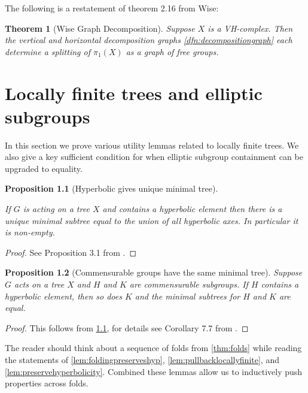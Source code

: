\documentclass[12pt,parskip=full]{report}
\theoremstyle{plain}
\newtheorem{thm}{Theorem}[section]
\newtheorem{prop}[thm]{Proposition}
\theoremstyle{definition}
\begin{document}
The following is a restatement of theorem 2.16 \cite{wisethesis} from Wise:
\begin{thm}[Wise Graph Decomposition]
\label{thm:wisegraph}
Suppose \(X\) is a VH-complex. Then the vertical and horizontal decomposition graphs \ref{dfn:decompositiongraph} each determine a splitting of \(\pi_1(X)\) as a graph of free groups. 
\end{thm}

\chapter{Locally finite trees and elliptic subgroups}

In this section we prove various utility lemmas related to locally finite trees. We also give a key sufficient condition for when elliptic subgroup containment can be upgraded to equality.

\begin{prop}
    [Hyperbolic gives unique minimal tree]
    \label{pro:uniquemintree}
    
    If $G$ is acting on a tree $X$ and contains a hyperbolic element then there is a unique minimal subtree equal to the union of all hyperbolic axes. In particular it is non-empty.
\end{prop}
\begin{proof}
See Proposition 3.1 from \cite{hymanbass}.
\end{proof}
\begin{prop}
    [Commensurable groups have the same minimal tree]
    \label{pro:commintree}
    Suppose $G$ acts on a tree $X$ and $H$ and $K$ are commensurable subgroups. If $H$ contains a hyperbolic element, then so does $K$ and the minimal subtrees for $H$ and $K$ are equal.
\end{prop}
\begin{proof}
    This follows from \ref{pro:uniquemintree}, for details see Corollary 7.7 from \cite{hymanbass}.
\end{proof}

The reader should think about a sequence of folds from \ref{thm:folds} while reading the statements of \ref{lem:foldingpreserveshyp}, \ref{lem:pullbacklocallyfinite}, and \ref{lem:preservehyperbolicity}. Combined these lemmas allow us to inductively push properties across folds.
\end{document}
